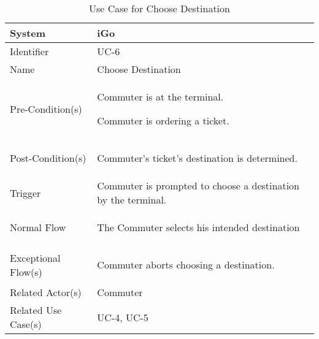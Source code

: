 \begin{table}[ht]
    \centering
    \begin{tabular}{|l|p{11cm}|}
         \hline
         System             & iGo\\
         \hline
         Identifier         & UC-6 \\
         \hline
         Name               & Choose Destination \\
         \hline
         Pre-Condition(s)   & 
         \begin{enumerate*}[itemjoin=\newline]
             \item Commuter is at the terminal.
             \item Commuter is ordering a ticket.
         \end{enumerate*} \\
         \hline
         Post-Condition(s)  & 
         \begin{enumerate*}[itemjoin=\newline]
             \item Commuter's ticket's destination is determined.
         \end{enumerate*} \\
         \hline
         Trigger            & Commuter is prompted to choose a destination by the terminal. \\
         \hline
         Normal Flow        & 
         \begin{enumerate*}[itemjoin=\newline]
             \item The Commuter selects his intended destination
         \end{enumerate*} \\
         \hline
         Exceptional Flow(s)& 
         \begin{enumerate*}[itemjoin=\newline]
             \item Commuter aborts choosing a destination.
         \end{enumerate*} \\
         \hline
         Related Actor(s)   & Commuter \\
         \hline
         Related Use Case(s)& UC-4, UC-5\\
         \hline
    \end{tabular}
    \caption{Use Case for Choose Destination}
    \label{tab:UC_ChooseDestination}
\end{table}


